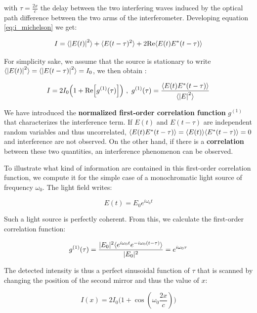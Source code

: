 \noindent with $\tau=\frac{2x}{c}$ the delay between the two interfering waves induced by the optical path difference between the two arms of the interferometer. Developing equation \ref{eq:i_michelson} we get:

\begin{equation}
    I=\langle\left\lvert E(t)\right\rvert^2\rangle  + \langle E(t-\tau)^2\rangle + 2 {\rm{Re}} \langle E(t) E^*(t-\tau)\rangle
    \label{eq:def_g1}
\end{equation}

For simplicity sake, we assume that the source is stationary to write $\langle\left\lvert E(t)\right\rvert^2\rangle = \langle\left\lvert E(t-\tau)\right\rvert^2\rangle = I_0$, we then obtain :

\begin{equation}
    I= 2 I_0 \Big(1 + {\rm{Re}} \Big[g^{(1)} (\tau) \Big] \Big) \ , \ g^{(1)} (\tau) = \frac{ \langle E(t) E^*(t-\tau)\rangle}{\langle\left\lvert E\right\rvert^2\rangle}
\end{equation}

\noindent We have introduced the \textbf{normalized first-order correlation function} $g^{(1)}$ that characterizes the interference term. If $E(t)$ and $E(t-\tau)$ are independent random variables and thus uncorrelated, $\langle E(t) E^*(t-\tau)\rangle = \langle E(t)\rangle \langle E^*(t-\tau)\rangle=0$ and interference are not observed. On the other hand, if there is a \textbf{correlation} between these two quantities, an interference phenomenon can be observed. 

To illustrate what kind of information are contained in this first-order correlation function, we compute it for the simple case of a monochromatic light source of frequency $\omega_0$. The light field writes:

\begin{equation}
    E(t)=E_0 e^{i \omega_0 t}
\end{equation}

\noindent Such a light source is perfectly coherent. From this, we calculate the first-order correlation function:

\begin{equation}
    g^{(1)} (\tau) = \frac{|E_0|^2 \langle e^{i\omega_0 t} e^{-i \omega_0 (t-\tau)}\rangle}{|E_0|^2} = e^{i \omega_0 \tau}
\end{equation}

\noindent The detected intensity is thus a perfect sinusoidal function of $\tau$ that is scanned by changing the position of the second mirror and thus the value of $x$:

\begin{equation}
I(x)= 2 I_0 \Big(1+\cos(\omega_0 \frac{2x}{c}) \Big)
\end{equation}


